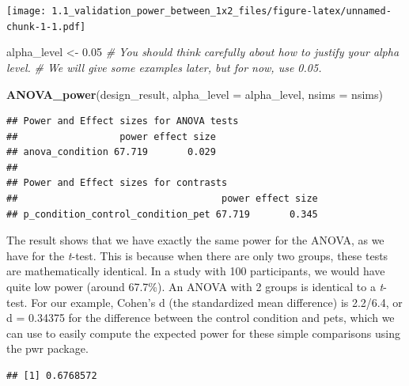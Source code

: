 \documentclass[]{article}
\newenvironment{Shaded}{\begin{snugshade}}{\end{snugshade}}
\newcommand{\KeywordTok}[1]{\textcolor[rgb]{0.13,0.29,0.53}{\textbf{#1}}}
\newcommand{\DataTypeTok}[1]{\textcolor[rgb]{0.13,0.29,0.53}{#1}}
\newcommand{\DecValTok}[1]{\textcolor[rgb]{0.00,0.00,0.81}{#1}}
\newcommand{\FloatTok}[1]{\textcolor[rgb]{0.00,0.00,0.81}{#1}}
\newcommand{\StringTok}[1]{\textcolor[rgb]{0.31,0.60,0.02}{#1}}
\newcommand{\CommentTok}[1]{\textcolor[rgb]{0.56,0.35,0.01}{\textit{#1}}}
\newcommand{\OperatorTok}[1]{\textcolor[rgb]{0.81,0.36,0.00}{\textbf{#1}}}
\newcommand{\NormalTok}[1]{#1}
\begin{document}
\texttt{[image: 1.1\_validation\_power\_between\_1x2\_files/figure-latex/unnamed-chunk-1-1.pdf]}

\begin{Shaded}
\begin{Highlighting}[]
\NormalTok{alpha_level <-}\StringTok{ }\FloatTok{0.05}
\CommentTok{# You should think carefully about how to justify your alpha level.}
\CommentTok{# We will give some examples later, but for now, use 0.05.}

\KeywordTok{ANOVA_power}\NormalTok{(design_result, }\DataTypeTok{alpha_level =}\NormalTok{ alpha_level, }\DataTypeTok{nsims =}\NormalTok{ nsims)}
\end{Highlighting}
\end{Shaded}

\begin{verbatim}
## Power and Effect sizes for ANOVA tests
##                  power effect size
## anova_condition 67.719       0.029
## 
## Power and Effect sizes for contrasts
##                                    power effect size
## p_condition_control_condition_pet 67.719       0.345
\end{verbatim}

The result shows that we have exactly the same power for the ANOVA, as
we have for the \emph{t}-test. This is because when there are only two
groups, these tests are mathematically identical. In a study with 100
participants, we would have quite low power (around 67.7\%). An ANOVA
with 2 groups is identical to a \emph{t}-test. For our example, Cohen's
d (the standardized mean difference) is 2.2/6.4, or d = 0.34375 for the
difference between the control condition and pets, which we can use to
easily compute the expected power for these simple comparisons using the
pwr package.

\begin{Shaded}
\end{Shaded}

\begin{verbatim}
## [1] 0.6768572
\end{verbatim}
\end{document}
